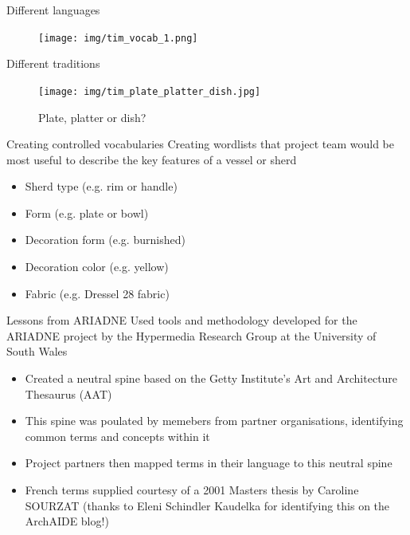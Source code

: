 \documentclass[xcolor=x11names, aspectratio=169,usenames,dvipsnames]{beamer}
\begin{document}
\begin{frame}{Different languages}
\begin{center}
\begin{figure}
\texttt{[image: img/tim\_vocab\_1.png]}
\end{figure}
\end{center}
\end{frame}

\begin{frame}{Different traditions}
\begin{center}
\begin{figure}
\texttt{[image: img/tim\_plate\_platter\_dish.jpg]}
\caption{Plate, platter or dish?}
\end{figure}
\end{center}
\end{frame}

\begin{frame}{Creating controlled vocabularies}
Creating wordlists that project team would be most useful to describe the key features of a vessel or sherd
\begin{itemize}
\item Sherd type (e.g. rim or handle)
\item Form (e.g. plate or bowl)
\item Decoration form (e.g. burnished)
\item Decoration color (e.g. yellow)
\item Fabric (e.g. Dressel 28 fabric)
\end{itemize}
\end{frame}

\begin{frame}{Lessons from ARIADNE}
\hfill{}\newline
Used tools and methodology developed for the ARIADNE project by the Hypermedia Research Group at the University of South Wales \newline
\begin{itemize}
\item Created a neutral spine based on the Getty Institute's Art and Architecture Thesaurus (AAT)
\item This spine was poulated by memebers from partner organisations, identifying common terms and concepts within it
\item Project partners then mapped terms in their language to this neutral spine
\item French terms supplied courtesy of a 2001 Masters thesis by Caroline SOURZAT (thanks to Eleni Schindler Kaudelka for identifying this on the ArchAIDE blog!)
\end{itemize}
\end{frame}
\end{document}
